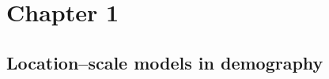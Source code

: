 \documentclass[12pt, xcolor=table]{beamer}  %
\begin{document}

\section{Chapter 1}
\subsection{Location--scale models in demography}
\end{document}
